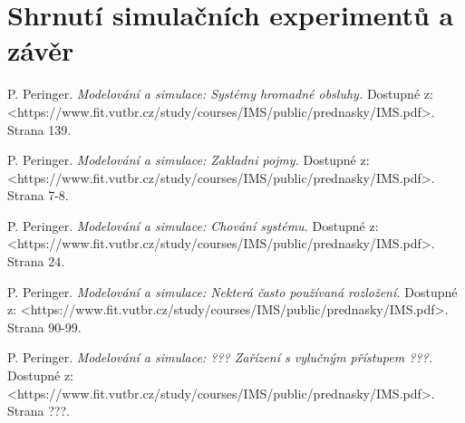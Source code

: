 \documentclass[12pt,a4paper]{article}
\begin{document}
\newpage


\section{Shrnutí simulačních experimentů a závěr}


\newpage

\begin{thebibliography}{99}

 P. Peringer.
\textit{Modelování a simulace: Systémy hromadné obsluhy.}
Dostupné z: \textless https://www.fit.vutbr.cz/study/courses/IMS/public/prednasky/IMS.pdf\textgreater.
Strana 139.

 P. Peringer.
\textit{Modelování a simulace: Zakladni pojmy.}
Dostupné z: \textless https://www.fit.vutbr.cz/study/courses/IMS/public/prednasky/IMS.pdf\textgreater.
Strana 7-8.

 P. Peringer.
\textit{Modelování a simulace: Chování systému.}
Dostupné z: \textless https://www.fit.vutbr.cz/study/courses/IMS/public/prednasky/IMS.pdf\textgreater.
Strana 24.

 P. Peringer.
\textit{Modelování a simulace: Nekterá často používaná rozložení.}
Dostupné z: \textless https://www.fit.vutbr.cz/study/courses/IMS/public/prednasky/IMS.pdf\textgreater.
Strana 90-99.

 P. Peringer.
\textit{Modelování a simulace: ??? Zařízení s vylučným přístupem ???.}
Dostupné z: \textless https://www.fit.vutbr.cz/study/courses/IMS/public/prednasky/IMS.pdf\textgreater.
Strana ???.


\end{thebibliography}
\end{document}
